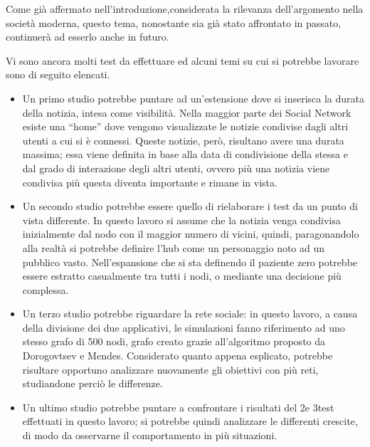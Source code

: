 Come già affermato nell'introduzione,considerata la rilevanza dell'argomento nella società moderna,
questo tema, nonostante sia già stato affrontato in passato, continuerà ad esserlo anche in futuro.

Vi sono ancora molti test da effettuare ed alcuni temi su cui si potrebbe lavorare sono di seguito elencati.
\begin{itemize}
 \item Un primo studio potrebbe puntare ad un'estensione dove si inserisca la durata della notizia, intesa come visibilità. 
 Nella maggior parte dei Social Network esiste una ``home'' dove vengono visualizzate le notizie 
 condivise dagli altri utenti a cui si è connessi.
 Queste notizie, però, risultano avere una durata massima; essa viene definita in base alla data di condivisione della stessa e
 dal grado di interazione degli altri utenti, ovvero più una notizia viene condivisa più questa diventa importante e rimane in vista.
 
 \item Un secondo studio potrebbe essere quello di rielaborare i test da un punto di vista differente. 
 In questo lavoro si assume che la notizia venga condivisa inizialmente dal nodo con il maggior numero di vicini, quindi, 
 paragonandolo alla realtà si potrebbe definire l'hub come un personaggio noto ad un pubblico vasto.
 Nell'espansione che si sta definendo il paziente zero potrebbe essere estratto casualmente tra tutti i nodi, o mediante una decisione più complessa.
 
 \item Un terzo studio potrebbe riguardare la rete sociale: in questo lavoro, a causa della divisione dei due applicativi, 
 le simulazioni fanno riferimento ad uno stesso grafo di 500 nodi, grafo creato grazie all'algoritmo proposto da Dorogovtsev e Mendes. 
 Considerato quanto appena esplicato, potrebbe risultare opportuno analizzare nuovamente gli obiettivi con più reti, studiandone perciò le differenze.
 
 \item Un ultimo studio potrebbe puntare a confrontare i risultati del 2\degree e 3\degree test effettuati in questo lavoro;  
 si potrebbe quindi analizzare le differenti crescite, di modo da osservarne il comportamento in più situazioni. 
\end{itemize}
















